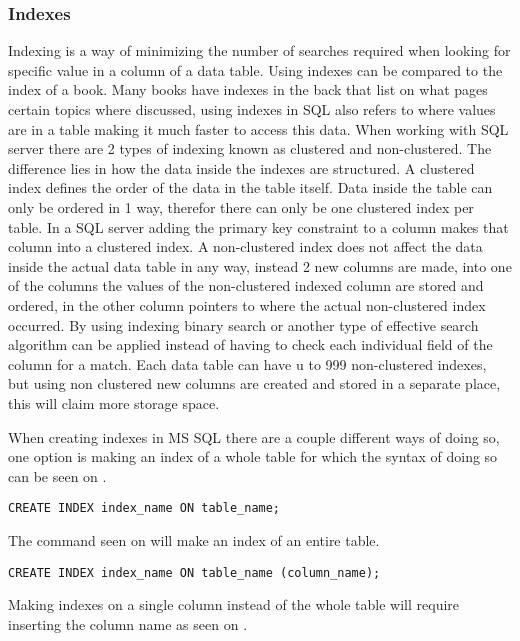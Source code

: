 \subsubsection{Indexes}
Indexing is a way of minimizing the number of searches required when looking for specific value in a column of a data table. Using indexes can be compared to the index of a book. Many books have indexes in the back that list on what pages certain topics where discussed, using indexes in SQL also refers to where values are in a table making it much faster to access this data. When working with SQL server there are 2 types of indexing known as clustered and non-clustered. The difference lies in how the data inside the indexes are structured. A clustered index defines the order of the data in the table itself. Data inside the table can only be ordered in 1 way, therefor there can only be one clustered index per table. In a SQL server adding the primary key constraint to a column makes that column into a clustered index. A non-clustered index does not affect the data inside the actual data table in any way, instead 2 new columns are made, into one of the columns the values of the non-clustered indexed column are stored and ordered, in the other column pointers to where the actual non-clustered index occurred. By using indexing binary search or another type of effective search algorithm can be applied instead of having to check each individual field of the column for a match. Each data table can have u to 999 non-clustered indexes, but using non clustered new columns are created and stored in a separate place, this will claim more storage space.\newline

\noindent
When creating indexes in MS SQL there are a couple different ways of doing so, one option is making an index of a whole table for which the syntax of doing so can be seen on .
\begin{lstlisting}[style=SQLstyle, numberblanklines=false, xleftmargin=0\textwidth, label=lst:example_of_using_indexes_for_table, numbers=none, caption={Example of using indexes on a table}]
CREATE INDEX index_name ON table_name;
\end{lstlisting}
\noindent
The command seen on  will make an index of an entire table.

\begin{lstlisting}[style=SQLstyle,xleftmargin=0\textwidth,  numberblanklines=false, label=lst:example_of_using_indexes, numbers=none, caption={Example of creating indexes on a column}]
CREATE INDEX index_name ON table_name (column_name);
\end{lstlisting}
\noindent
Making indexes on a single column instead of the whole table will require inserting the column name as seen on .

